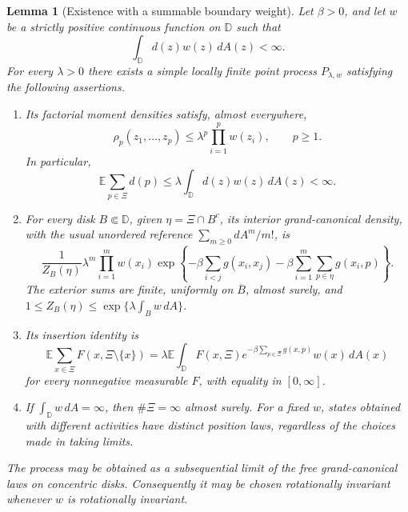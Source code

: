 \documentclass[11pt,a4paper]{article}
\numberwithin{equation}{section}
\newtheorem{lemma}[theorem]{Lemma}
\theoremstyle{definition}
\theoremstyle{remark}
\newcommand{\D}{\mathbb D}
\begin{document}
\begin{lemma}[Existence with a summable boundary weight]
\label{lem:green-gibbs-summable-activity}
Let $\beta>0$, and let $w$ be a strictly positive continuous function on
$\D$ such that
\begin{equation}\label{eq:green-gibbs-weight-hypotheses}
 \int_\D d(z)w(z)\,dA(z)<\infty.
\end{equation}
For every $\lambda>0$ there exists a simple locally finite point process
$P_{\lambda,w}$ satisfying the following assertions.
\begin{enumerate}
\item Its factorial moment densities satisfy, almost everywhere,
\begin{equation}\label{eq:green-gibbs-ruelle-bound}
 \rho_p(z_1,\ldots,z_p)\le
       \lambda^p\prod_{i=1}^p w(z_i),\qquad p\ge1.
\end{equation}
In particular,
\begin{equation}\label{eq:green-gibbs-finite-depth}
 \mathbb E\sum_{p\in\Xi}d(p)
       \le\lambda\int_\D d(z)w(z)\,dA(z)<\infty.
\end{equation}
\item For every disk $B\Subset\D$, given $\eta=\Xi\cap B^c$, its
interior grand-canonical density, with the usual unordered reference
$\sum_{m\ge0}dA^m/m!$, is
\begin{equation}\label{eq:green-grand-canonical-density}
 \frac1{Z_B(\eta)}\lambda^m
 \prod_{i=1}^m w(x_i)
 \exp\left\{-\beta\sum_{i<j}g(x_i,x_j)
             -\beta\sum_{i=1}^m\sum_{p\in\eta}g(x_i,p)\right\}.
\end{equation}
The exterior sums are finite, uniformly on $\overline B$, almost surely,
and $1\le Z_B(\eta)\le\exp\{\lambda\int_Bw\,dA\}$.
\item Its insertion identity is
\begin{equation}\label{eq:green-grand-gnz}
 \mathbb E\sum_{x\in\Xi} F(x,\Xi\setminus\{x\})
 =\lambda\mathbb E\int_\D F(x,\Xi)
             e^{-\beta\sum_{p\in\Xi}g(x,p)}w(x)\,dA(x)
\end{equation}
for every nonnegative measurable $F$, with equality in $[0,\infty]$.
\item If $\int_\D w\,dA=\infty$, then $\#\Xi=\infty$ almost surely.
For a fixed $w$, states obtained with different activities have distinct
position laws, regardless of the choices made in taking limits.
\end{enumerate}
The process may be obtained as a subsequential limit of the free
 grand-canonical laws on concentric disks.  Consequently it may be chosen
rotationally invariant whenever $w$ is rotationally invariant.
\end{lemma}
\end{document}
